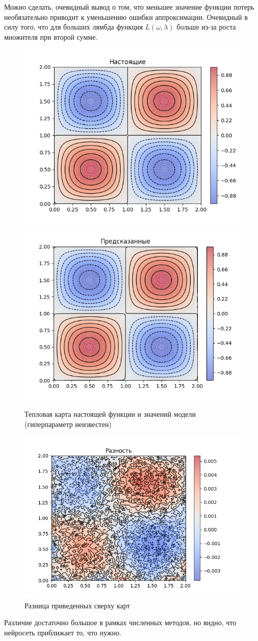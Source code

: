 Можно сделать, очевидный вывод о том, что меньшее значение функции потерь необязательно приводит к уменьшению ошибки аппроксимации.
Очевидный в силу того, что для больших лямбда функция $L(\omega, \lambda)$ больше из-за роста множителя при второй сумме.

\begin{figure}[ht!]
    \centering
    \includegraphics[width=0.5\hsize]{images/3.png}
    \includegraphics[width=0.5\hsize]{images/4.png}
    \caption{Тепловая карта настоящей функции и значений модели (гиперпараметр неизвестен)}
\end{figure}

\begin{figure}[ht!]
    \centering
    \includegraphics[width=0.9\hsize]{images/19.png}
    \caption{Разница приведенных сверху карт}
\end{figure}

Различие достаточно большое в рамках численных методов, но видно, что нейросеть приближает то, что нужно.

\medskip
\medskip
\medskip
\medskip
